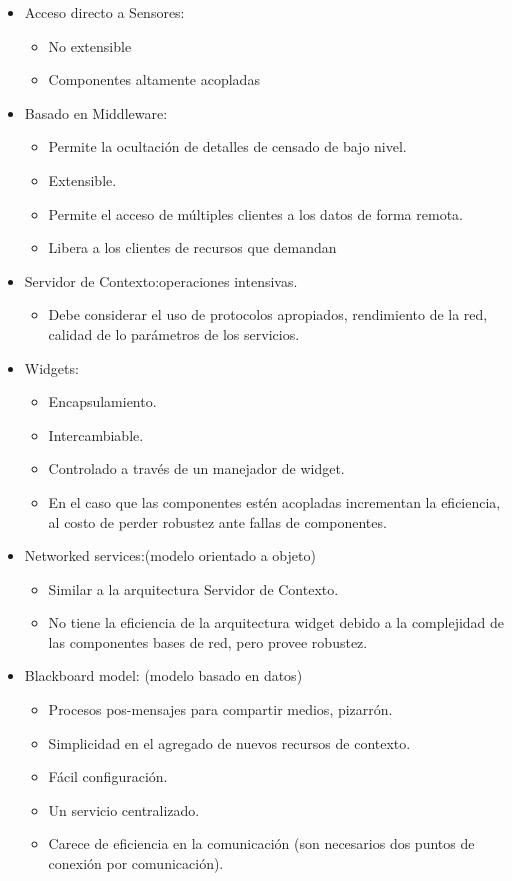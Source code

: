 \begin{itemize}
\item Acceso directo a Sensores:
\begin{itemize}
\item No extensible
\item Componentes altamente acopladas
\end{itemize}
\hline
\item Basado en Middleware: 	   
\begin{itemize}
\item Permite la ocultación de detalles de censado de bajo nivel.
\item Extensible.
\item Permite el acceso de múltiples clientes a los datos de forma remota.
\item Libera a los clientes de recursos que demandan
\end{itemize}
\hline
\item Servidor de Contexto:operaciones intensivas.
\begin{itemize}
\item Debe considerar el uso de protocolos apropiados, rendimiento de la red,
calidad de lo parámetros de los servicios.
\end{itemize}
\hline
\item Widgets:
\begin{itemize}
\item Encapsulamiento.
\item Intercambiable.
\item Controlado a través de un manejador de widget.
\item En el caso que las componentes estén acopladas incrementan la
eficiencia, al costo de perder robustez ante fallas de componentes.
\hline
\end{itemize}
\item Networked services:(modelo orientado a objeto) 
\begin{itemize}
\item Similar a la arquitectura Servidor de Contexto.
\item No tiene la eficiencia de la arquitectura widget debido a la complejidad
de las componentes bases de red, pero provee robustez.
\end{itemize}
\hline
\item Blackboard model: (modelo basado en datos) 	
\begin{itemize}
\item  Procesos pos-mensajes para compartir medios, pizarrón.
\item Simplicidad en el agregado de nuevos recursos de contexto.
\item Fácil configuración.
\item Un servicio centralizado.\\
\item Carece de eficiencia en la comunicación (son necesarios dos puntos
de conexión por comunicación). 
\end{itemize}
\hline
\end{itemize}


